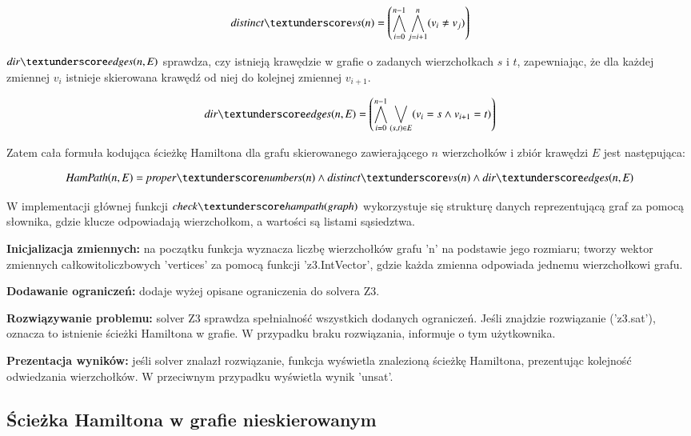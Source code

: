 \begin{align*}
	\distinctvs = \left( \bigwedge_{i=0}^{n-1} \bigwedge_{j=i+1}^{n} (v_i \neq v_j) \right)
\end{align*}

$\diredges$ sprawdza, czy istnieją krawędzie w grafie o zadanych wierzchołkach \(s\) i \(t\), zapewniając, że dla każdej zmiennej \(v_i\) istnieje skierowana krawędź od niej do kolejnej zmiennej \(v_{i+1}\).​

\begin{align*}
	\diredges = \left( \bigwedge_{i=0}^{n-1} \bigvee_{(s,t) \in E} (v_i = s \land v_{i+1} = t) \right)
\end{align*}

\vspace{1cm}

Zatem cała formuła kodująca ścieżkę Hamiltona dla grafu skierowanego zawierającego \(n\) wierzchołków i zbiór krawędzi \(E\) jest następująca:

\begin{align*}
	\HamPath(n, E) = \propernumbers \land \distinctvs \land \diredges
\end{align*}

W implementacji głównej funkcji $\checkhampath$ wykorzystuje się strukturę danych reprezentującą graf za pomocą słownika, gdzie klucze odpowiadają wierzchołkom, a wartości są listami sąsiedztwa.

\textbf{Inicjalizacja zmiennych: } na początku funkcja wyznacza liczbę wierzchołków grafu 'n' na podstawie jego rozmiaru; tworzy wektor zmiennych całkowitoliczbowych 'vertices' za pomocą funkcji 'z3.IntVector', gdzie każda zmienna odpowiada jednemu wierzchołkowi grafu.
	
\textbf{Dodawanie ograniczeń: } dodaje wyżej opisane ograniczenia do solvera Z3.

\textbf{Rozwiązywanie problemu: } solver Z3 sprawdza spełnialność wszystkich dodanych ograniczeń. Jeśli znajdzie rozwiązanie ('z3.sat'), oznacza to istnienie ścieżki Hamiltona w grafie. W przypadku braku rozwiązania, informuje o tym użytkownika.

\textbf{Prezentacja wyników: } jeśli solver znalazł rozwiązanie, funkcja wyświetla znalezioną ścieżkę Hamiltona, prezentując kolejność odwiedzania wierzchołków. W przeciwnym przypadku wyświetla wynik 'unsat'.




\subsection{Ścieżka Hamiltona w grafie nieskierowanym}

